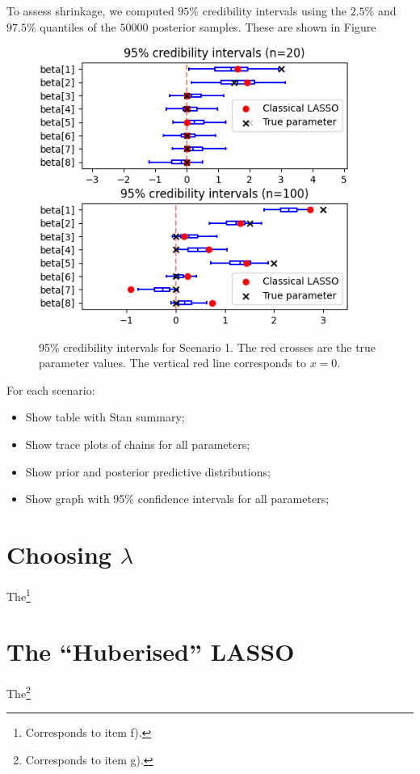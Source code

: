 \documentclass[a4paper, 10pt]{article}
\begin{document}
To assess shrinkage, we computed $ 95\% $ credibility intervals using the $ 2.5\% $ and $ 97.5\% $ quantiles of the $ 50 000 $ posterior samples.
These are shown in Figure
\begin{figure}[htb]
    \begin{center}
        \includegraphics[width=.6\textwidth]{../outputs/artificial_scenarios_n=20/scenario_1/credibility_intervals.png}
        \vspace{1cm}
        \includegraphics[width=.6\textwidth]{../outputs/artificial_scenarios_n=100/scenario_1/credibility_intervals.png}
    \end{center}
    \caption[95\% credibility intervals for Scenario 1.]{95\% credibility intervals for Scenario 1. The red crosses are the true parameter values. The vertical red line corresponds to $ x = 0 $.}
    \label{}
\end{figure}

For each scenario:
\begin{itemize}
    \item Show table with Stan summary;
    \item Show trace plots of chains for all parameters;
    \item Show prior and posterior predictive distributions;
    \item Show graph with 95\% confidence intervals for all parameters;
\end{itemize}

\section{Choosing $\lambda$}
The\footnote{Corresponds to item f).}

\section{The ``Huberised'' LASSO}
The\footnote{Corresponds to item g).}

\printbibliography
\end{document}
